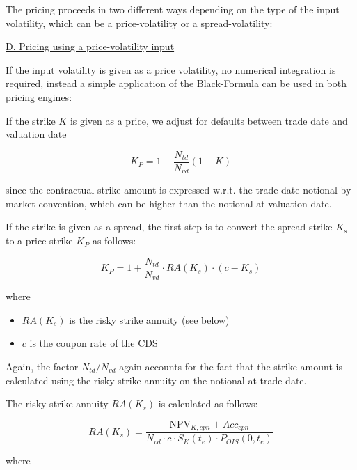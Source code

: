 The pricing proceeds in two different ways depending on the type of the input volatility, which can be a
price-volatility or a spread-volatility:

\underline{D. Pricing using a price-volatility input}

If the input volatility is given as a price volatility, no numerical integration is required, instead a simple
application of the Black-Formula can be used in both pricing engines:

If the strike $K$ is given as a price, we adjust for defaults between trade date and valuation date

\begin{equation}
K_P = 1 - \frac{N_{td}}{N_{vd}} \left( 1 - K \right)
\end{equation}

since the contractual strike amount is expressed w.r.t. the trade date notional by market convention, which can be
higher than the notional at valuation date.

If the strike is given as a spread, the first step is to convert the spread strike $K_s$ to a price strike $K_P$ as
follows:

\begin{equation}
K_P = 1 + \frac{N_{td}}{N_{vd}} \cdot RA(K_s) \cdot (c - K_s)
\end{equation}

where

\begin{itemize}
\item $RA(K_s)$ is the risky strike annuity (see below)
\item $c$ is the coupon rate of the CDS
\end{itemize}

Again, the factor $N_{td} / N_{vd}$ again accounts for the fact that the strike amount is calculated using the risky
strike annuity on the notional at trade date. 

The risky strike annuity $RA(K_s)$ is calculated as follows:

\begin{equation}\label{pricing:cr_indexcdsoption_strike_annuity}
RA(K_s) = \frac{\text{NPV}_{K,cpn} + Acc_{cpn}}{N_{vd} \cdot c \cdot S_K(t_e) \cdot P_{OIS}(0,t_e)}
\end{equation}

where

